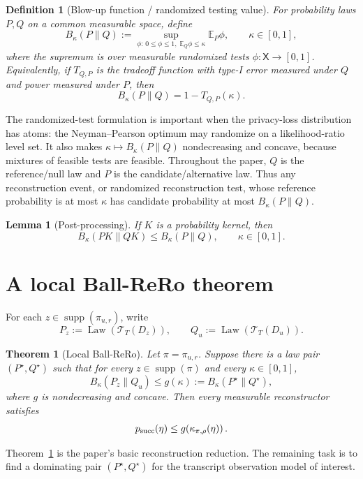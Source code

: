 \documentclass[conference,compsoc]{IEEEtran}
\newtheorem{definition}{Definition}
\newtheorem{theorem}{Theorem}
\newtheorem{lemma}{Lemma}
\DeclareMathOperator{\Law}{Law}
\DeclareMathOperator{\supp}{supp}
\newcommand{\E}{\mathbb{E}}
\newcommand{\cT}{\mathcal{T}}
\begin{document}
\begin{definition}[Blow-up function / randomized testing value]
For probability laws $P,Q$ on a common measurable space, define
\[
B_\kappa(P\|Q)
:=
\sup_{\phi:\,0\le \phi\le1,\; \E_Q\phi\le \kappa}
\E_P\phi,
\qquad
\kappa\in[0,1],
\]
where the supremum is over measurable randomized tests
$\phi:\mathsf X\to[0,1]$.  Equivalently, if $T_{Q,P}$ is the tradeoff function
with type-I error measured under $Q$ and power measured under $P$, then
\[
B_\kappa(P\|Q)=1-T_{Q,P}(\kappa).
\]
\end{definition}

The randomized-test formulation is important when the privacy-loss distribution
has atoms: the Neyman--Pearson optimum may randomize on a likelihood-ratio
level set.  It also makes $\kappa\mapsto B_\kappa(P\|Q)$ nondecreasing and
concave, because mixtures of feasible tests are feasible.  Throughout the
paper, $Q$ is the reference/null law and $P$ is the candidate/alternative law.
Thus any reconstruction event, or randomized reconstruction test, whose
reference probability is at most $\kappa$ has candidate probability at most
$B_\kappa(P\|Q)$.

\begin{lemma}[Post-processing]
\label{lem:post-processing}
If $K$ is a probability kernel, then
\[
B_\kappa(PK\|QK)\le B_\kappa(P\|Q),
\qquad
\kappa\in[0,1].
\]
\end{lemma}

\section{A local Ball-ReRo theorem}
\label{sec:local-rero}

For each $z\in\supp(\pi_{u,r})$, write
\[
P_z:=\Law(\cT_T(D_z)),
\qquad
Q_u:=\Law(\cT_T(D_u)).
\]

\begin{theorem}[Local Ball-ReRo]
\label{thm:local-ball-rero}
Let $\pi=\pi_{u,r}$.  Suppose there is a law pair $(P^\star,Q^\star)$ such that
for every $z\in\supp(\pi)$ and every $\kappa\in[0,1]$,
\[
B_\kappa(P_z\|Q_u)
\le
 g(\kappa)
:=
B_\kappa(P^\star\|Q^\star),
\]
where $g$ is nondecreasing and concave.  Then every measurable reconstructor
satisfies
\[
p_{\rm succ}(\eta)
\le
g\!\left(\kappa_{\pi,\rho}(\eta)\right).
\]
\end{theorem}

Theorem~\ref{thm:local-ball-rero} is the paper's basic reconstruction
reduction.  The remaining task is to find a dominating pair $(P^\star,Q^\star)$
for the transcript observation model of interest.
\end{document}
